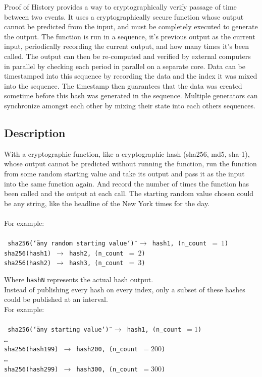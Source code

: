\documentclass[12pt]{article}
\begin{document}
Proof of History provides a way to cryptographically verify passage of time between two events. It uses a cryptographically secure function whose output cannot be predicted from the input, and must be completely executed to generate the output. The function is run in a sequence, it’s previous output as the current input, periodically recording the current output, and how many times it’s been called. The output can then be re-computed and verified by external computers in parallel by checking each period in parallel on a separate core. Data can be timestamped into this sequence by recording the data and the index it was mixed into the sequence. The timestamp then guarantees that the data was created sometime before this hash was generated in the sequence. Multiple generators can synchronize amongst each other by mixing their state into each others sequences. \\

\subsection{Description}
With a cryptographic function, like a cryptographic hash (sha256, md5, sha-1), whose output cannot be predicted without running the function, run the function from some random starting value and take its output and pass it as the input into the same function again.  And record the number of times the function has been called and the output at each call.  The starting random value chosen could be any string, like the headline of the New York times for the day.
\\\\
\noindent For example: \\\\\noindent
\texttt{
  sha256(\char`\"any random starting value\char`\") $\rightarrow$
  hash1, (n\_count~$=~1$) \\
  sha256(hash1) $\rightarrow$ hash2, (n\_count~$=~2$)\\
  sha256(hash2) $\rightarrow$ hash3, (n\_count~$=~3$)\\
}

\noindent Where \texttt{hashN} represents the actual hash output. \\

Instead of publishing every hash on every index, only a subset of
these hashes could be published at an interval.\\

\noindent For example:\\\\\noindent
\texttt{
 sha256(\char`\"any starting value\char`\") $\rightarrow$ hash1, (n\_count~$=1$)\\
\ldots\\
sha256(hash199) $\rightarrow$ hash200, (n\_count~$=200$)\\
\ldots\\
sha256(hash299) $\rightarrow$ hash300, (n\_count~$=300$)\\
}
\end{document}
